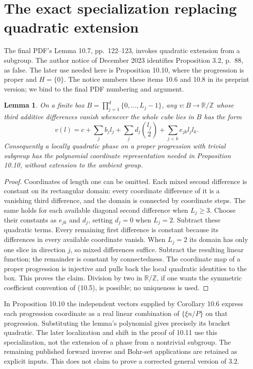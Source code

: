\documentclass[11pt]{article}
\newtheorem{lemma}{Lemma}\newtheorem{theorem}[lemma]{Theorem}
\newcommand{\R}{\mathbb R}\newcommand{\Z}{\mathbb Z}
\begin{document}
\section{The exact specialization replacing quadratic extension}

The final PDF's Lemma 10.7, pp.~122--123, invokes quadratic extension
from a subgroup. The author notice of December 2023 identifies
Proposition 3.2, p.~88, as false. The later use needed here is
Proposition 10.10, where the progression is proper and $H=\{0\}$.
The notice numbers these items 10.6 and 10.8 in its preprint version;
we bind to the final PDF numbering and argument.

\begin{lemma}\label{lem:box}
On a finite box $B=\prod_{j=1}^d\{0,\ldots,L_j-1\}$, any
$v:B\to\R/\Z$ whose third additive differences vanish whenever
the whole cube lies in $B$ has the form
\[
 v(l)=c+\sum_j b_jl_j+\sum_j d_j\binom{l_j}{2}
                       +\sum_{j<k}e_{jk}l_jl_k.
\]
Consequently a locally quadratic phase on a proper progression with
trivial subgroup has the polynomial coordinate representation needed
in Proposition 10.10, without extension to the ambient group.
\end{lemma}
\begin{proof}
Coordinates of length one can be omitted. Each mixed second difference
is constant on its rectangular domain: every coordinate difference of
it is a vanishing third difference, and the domain is connected by
coordinate steps. The same holds for each available diagonal second
difference when $L_j\geq3$. Choose their constants as $e_{jk}$ and
$d_j$, setting $d_j=0$ when $L_j=2$. Subtract these quadratic terms.
Every remaining first difference is constant because its differences
in every available coordinate vanish. When $L_j=2$ its domain has only
one slice in direction $j$, so mixed differences suffice. Subtract the
resulting linear function; the remainder is constant by connectedness.
The coordinate map of a proper progression is injective and pulls
back the local quadratic identities to the box. This proves the
claim. Division by two in $\R/\Z$, if one wants the symmetric
coefficient convention of (10.5), is possible; no uniqueness is used.
\end{proof}

In Proposition 10.10 the independent vectors supplied by Corollary 10.6
express each progression coordinate as a real linear combination of
$\{\xi n/P\}$ on that progression. Substituting the lemma's polynomial
gives precisely its bracket quadratic. The later localization and
shift in the proof of 10.11 use this specialization, not the extension
of a phase from a nontrivial subgroup. The remaining published forward
inverse and Bohr-set applications are retained as explicit inputs.
This does not claim to prove a corrected general version of 3.2.
\end{document}
